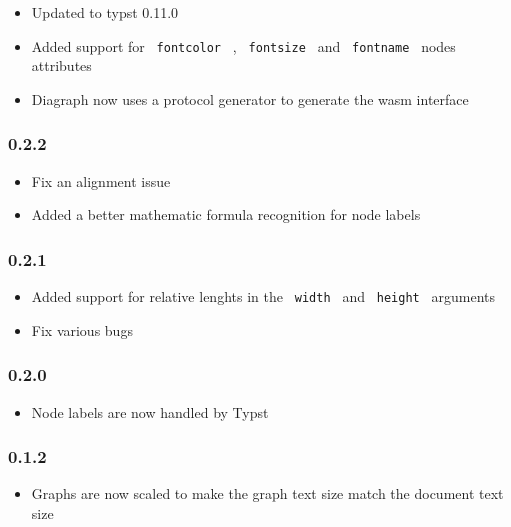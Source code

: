 \begin{itemize}
\tightlist
\item
  Updated to typst 0.11.0
\item
  Added support for \texttt{\ fontcolor\ } , \texttt{\ fontsize\ } and
  \texttt{\ fontname\ } nodes attributes
\item
  Diagraph now uses a protocol generator to generate the wasm interface
\end{itemize}

\subsubsection{0.2.2}\label{section-4}

\begin{itemize}
\tightlist
\item
  Fix an alignment issue
\item
  Added a better mathematic formula recognition for node labels
\end{itemize}

\subsubsection{0.2.1}\label{section-5}

\begin{itemize}
\tightlist
\item
  Added support for relative lenghts in the \texttt{\ width\ } and
  \texttt{\ height\ } arguments
\item
  Fix various bugs
\end{itemize}

\subsubsection{0.2.0}\label{section-6}

\begin{itemize}
\tightlist
\item
  Node labels are now handled by Typst
\end{itemize}

\subsubsection{0.1.2}\label{section-7}

\begin{itemize}
\tightlist
\item
  Graphs are now scaled to make the graph text size match the document
  text size
\end{itemize}

